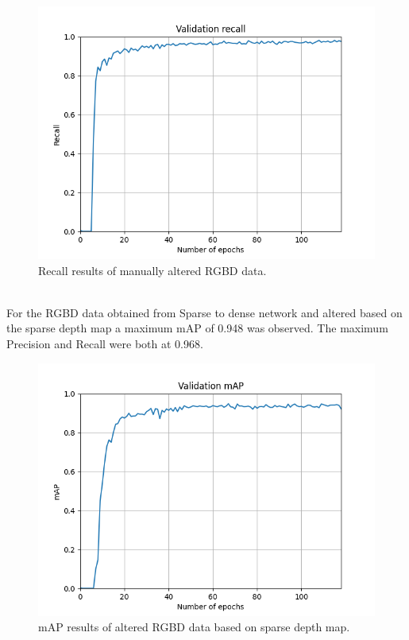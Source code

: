 \documentclass[twoside]{ctuthesis}
\theoremstyle{plain}
\theoremstyle{definition}
\theoremstyle{note}
\begin{document}
\begin{figure}[h!]
	\centering
	\includegraphics[width=\textwidth]{run-s2d_50filter-tag-validation_recall.png}
	\caption{Recall results of manually altered RGBD data.}
\end{figure}
\pagebreak
\\
For the RGBD data obtained from Sparse to dense network and altered based on the sparse depth map a maximum mAP of 0.948 was observed. The maximum Precision and Recall were both at 0.968.
\begin{figure}[h!]
	\centering
	\includegraphics[width=\textwidth]{run-depth_filter120e-tag-validation_mAP.png}
	\caption{mAP results of altered RGBD data based on sparse depth map.}
\end{figure}
\end{document}
